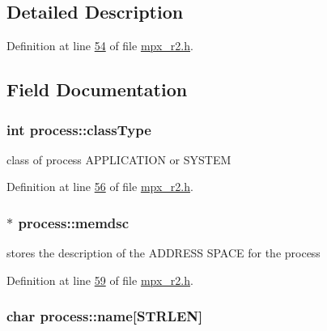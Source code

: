 \subsection{Detailed Description}


Definition at line \hyperlink{mpx__r2_8h_source_l00054}{54} of file \hyperlink{mpx__r2_8h_source}{mpx\_\-r2.h}.



\subsection{Field Documentation}
\hypertarget{structprocess_ac83f8c634a3b58ea5364e9f90ee3bcc2}{
\subsubsection[{classType}]{\setlength{\rightskip}{0pt plus 5cm}int {\bf process::classType}}}
\label{structprocess_ac83f8c634a3b58ea5364e9f90ee3bcc2}


class of process APPLICATION or SYSTEM 



Definition at line \hyperlink{mpx__r2_8h_source_l00056}{56} of file \hyperlink{mpx__r2_8h_source}{mpx\_\-r2.h}.

\hypertarget{structprocess_a163551ab7b60184b48e5d440fcd5c2b8}{
\subsubsection[{memdsc}]{$\ast$ {\bf process::memdsc}}}
\label{structprocess_a163551ab7b60184b48e5d440fcd5c2b8}


stores the description of the ADDRESS SPACE for the process 



Definition at line \hyperlink{mpx__r2_8h_source_l00059}{59} of file \hyperlink{mpx__r2_8h_source}{mpx\_\-r2.h}.

\hypertarget{structprocess_ab6613e7bde642a754f71b9f60053cd1a}{
\subsubsection[{name}]{\setlength{\rightskip}{0pt plus 5cm}char {\bf process::name}\mbox{[}STRLEN\mbox{]}}}
\label{structprocess_ab6613e7bde642a754f71b9f60053cd1a}


